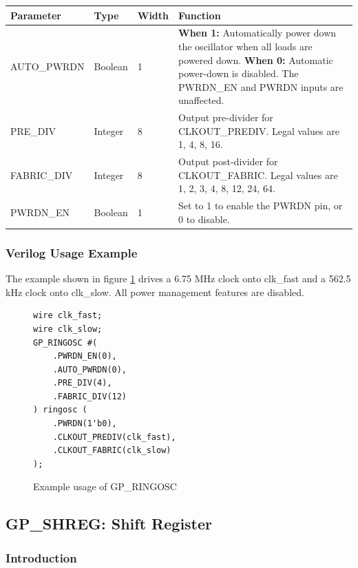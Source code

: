 \documentclass{article}
\begin{document}
\begin{tabularx}{5in}{|l|l|l|X|}
\hline
{\bfseries Parameter} & {\bfseries Type} & {\bfseries Width} & {\bfseries Function} \\
\hline
AUTO\_PWRDN & Boolean & 1 & 
	{\bfseries When 1: } \newline Automatically power down the oscillator when all loads are powered down. \newline
	{\bfseries When 0: } \newline Automatic power-down is disabled. The PWRDN\_EN and PWRDN inputs are unaffected.\\
\hline
PRE\_DIV & Integer & 8 &
	Output pre-divider for CLKOUT\_PREDIV. Legal values are 1, 4, 8, 16. \\
\hline
FABRIC\_DIV & Integer & 8 &
	Output post-divider for CLKOUT\_FABRIC. Legal values are 1, 2, 3, 4, 8, 12, 24, 64. \\
\hline
PWRDN\_EN & Boolean & 1 & Set to 1 to enable the PWRDN pin, or 0 to disable. \\
\hline
\end{tabularx}

\pagebreak
\subsubsection{Verilog Usage Example}

The example shown in figure \ref{gp-ringosc-example} drives a 6.75 MHz clock onto clk\_fast and a 562.5 kHz clock onto 
clk\_slow. All power management features are disabled.

\begin{figure}[h]
\begin{lstlisting}
wire clk_fast;
wire clk_slow;
GP_RINGOSC #(
	.PWRDN_EN(0),
	.AUTO_PWRDN(0),
	.PRE_DIV(4),
	.FABRIC_DIV(12)
) ringosc (
	.PWRDN(1'b0),
	.CLKOUT_PREDIV(clk_fast),
	.CLKOUT_FABRIC(clk_slow)
);
\end{lstlisting}
\caption{Example usage of GP\_RINGOSC}
\label{gp-ringosc-example}
\end{figure}


\pagebreak
\clearpage
\subsection{GP\_SHREG: Shift Register}

\subsubsection{Introduction}
\end{document}
